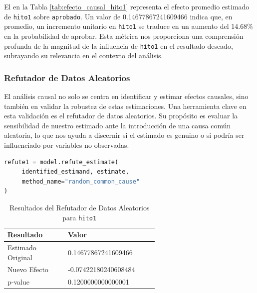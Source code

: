 El  en la Tabla \ref{tab:efecto_causal_hito1} representa el efecto promedio estimado de \texttt{hito1} sobre \texttt{aprobado}. Un valor de 0.14677867241609466 indica que, en promedio, un incremento unitario en \texttt{hito1} se traduce en un aumento del 14.68\% en la probabilidad de aprobar. Esta métrica nos proporciona una comprensión profunda de la magnitud de la influencia de \texttt{hito1} en el resultado deseado, subrayando su relevancia en el contexto del análisis.

\subsubsection{Refutador de Datos Aleatorios}

El análisis causal no solo se centra en identificar y estimar efectos causales, sino también en validar la robustez de estas estimaciones. Una herramienta clave en esta validación es el refutador de datos aleatorios. Su propósito es evaluar la sensibilidad de nuestro estimado ante la introducción de una causa común aleatoria, lo que nos ayuda a discernir si el estimado es genuino o si podría ser influenciado por variables no observadas.

\begin{minipage}{0.5\textwidth}
    \begin{lstlisting}[language=Python, caption=Refutador de datos aleatorios para \texttt{hito1}, label=lst:RefutadorDatosAleatoriosHito1]
refute1 = model.refute_estimate(
     identified_estimand, estimate, 
     method_name="random_common_cause"
)
\end{lstlisting}
\end{minipage}
\hfill
\begin{minipage}{0.45\textwidth}
    \begin{table}[H]
        \centering        
        \begin{tabular}{lp{0.6\linewidth}}
            \toprule
            \textbf{Resultado} & \textbf{Valor} \\
            \midrule
            Estimado Original & 0.14677867241609466 \\
            Nuevo Efecto & -0.07422180240608484 \\
            p-value & 0.1200000000000001 \\
            \bottomrule
        \end{tabular}
        \caption{Resultados del Refutador de Datos Aleatorios para \texttt{hito1}}
        \label{tab:refutador_datos_aleatorios_hito1}
    \end{table}
\end{minipage}

